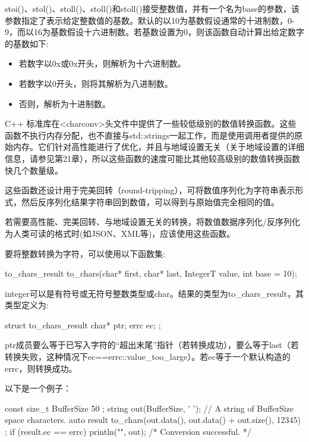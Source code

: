 stoi()、stol()、stoll()、stoll()和stoll()接受整数值，并有一个名为base的参数，该参数指定了表示给定整数值的基数。默认的以10为基数假设通常的十进制数，0-9，而以16为基数假设十六进制数。若基数设置为0，则该函数自动计算出给定数字的基数如下:

\begin{itemize}
\item
若数字以0x或0x开头，则解析为十六进制数。

\item
若数字以0开头，则将其解析为八进制数。

\item
否则，解析为十进制数。
\end{itemize}


C++ 标准库在<charconv>头文件中提供了一些较低级别的数值转换函数。这些函数不执行内存分配，也不直接与std::strings一起工作，而是使用调用者提供的原始内存。它们针对高性能进行了优化，并且与地域设置无关（关于地域设置的详细信息，请参见第21章），所以这些函数的速度可能比其他较高级别的数值转换函数快几个数量级。

这些函数还设计用于完美回转（round-tripping），可将数值序列化为字符串表示形式，然后反序列化结果字符串回到数值，可以得到与原始值完全相同的值。

若需要高性能、完美回转、与地域设置无关的转换，将数值数据序列化/反序列化为人类可读的格式时(如JSON、XML等)，应该使用这些函数。


要将整数转换为字符，可以使用以下函数集:

\begin{cpp}
to_chars_result to_chars(char* first, char* last, IntegerT value, int base = 10);
\end{cpp}

integer可以是有符号或无符号整数类型或char。结果的类型为to\_chars\_result，其类型定义为:

\begin{cpp}
struct to_chars_result {
    char* ptr;
    errc ec;
};
\end{cpp}

ptr成员要么等于已写入字符的“超出末尾”指针（若转换成功），要么等于last（若转换失败，这种情况下ec==errc::value\_too\_large）。若ec等于一个默认构造的errc，则转换成功。

以下是一个例子：

\begin{cpp}
const size_t BufferSize { 50 };
string out(BufferSize, ' '); // A string of BufferSize space characters.
auto result { to_chars(out.data(), out.data() + out.size(), 12345) };
if (result.ec == errc{}) { println("{}", out); /* Conversion successful. */ }
\end{cpp}

